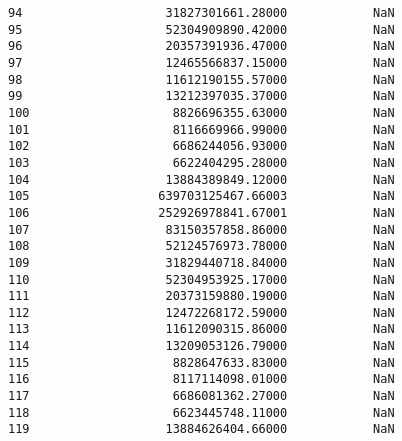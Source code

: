 \documentclass[11pt]{article}
\begin{document}
\begin{tcolorbox}[breakable, size=fbox, boxrule=.5pt, pad at break*=1mm, opacityfill=0]
\begin{Verbatim}[commandchars=\\\{\}]
94                    31827301661.28000            NaN
95                    52304909890.42000            NaN
96                    20357391936.47000            NaN
97                    12465566837.15000            NaN
98                    11612190155.57000            NaN
99                    13212397035.37000            NaN
100                    8826696355.63000            NaN
101                    8116669966.99000            NaN
102                    6686244056.93000            NaN
103                    6622404295.28000            NaN
104                   13884389849.12000            NaN
105                  639703125467.66003            NaN
106                  252926978841.67001            NaN
107                   83150357858.86000            NaN
108                   52124576973.78000            NaN
109                   31829440718.84000            NaN
110                   52304953925.17000            NaN
111                   20373159880.19000            NaN
112                   12472268172.59000            NaN
113                   11612090315.86000            NaN
114                   13209053126.79000            NaN
115                    8828647633.83000            NaN
116                    8117114098.01000            NaN
117                    6686081362.27000            NaN
118                    6623445748.11000            NaN
119                   13884626404.66000            NaN


\end{Verbatim}
\end{tcolorbox}
\end{document}
